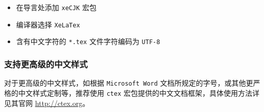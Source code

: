 \begin{itemize}
    \item 在导言处添加 \texttt{xeCJK} 宏包
    \item 编译器选择 \texttt{XeLaTex}
    \item 含有中文字符的 \texttt{*.tex} 文件字符编码为 \texttt{UTF-8}
\end{itemize}

\subsubsection{支持更高级的中文样式}

对于更高级的中文样式，如根据 \texttt{Microsoft Word} 文档所规定的字号，或其他更严格的中文样式定制等，推荐使用 \texttt{ctex} 宏包提供的中文文档框架，具体使用方法详见其官网 \url{http://ctex.org}。
